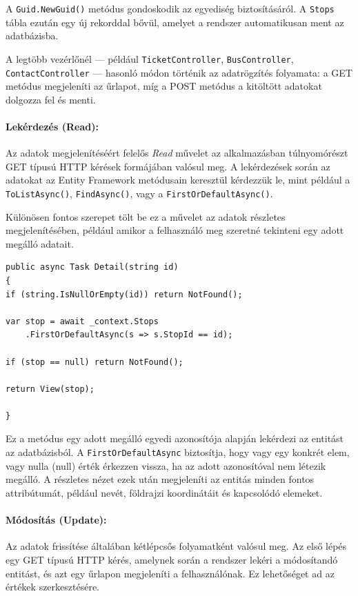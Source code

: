 A \texttt{Guid.NewGuid()} metódus gondoskodik az egyediség biztosításáról. A \texttt{Stops} tábla ezután egy új rekorddal bővül, amelyet a rendszer automatikusan ment az adatbázisba.

A legtöbb vezérlőnél — például \texttt{TicketController}, \texttt{BusController}, \texttt{ContactController} — hasonló módon történik az adatrögzítés folyamata: a GET metódus megjeleníti az űrlapot, míg a POST metódus a kitöltött adatokat dolgozza fel és menti.


\paragraph{Lekérdezés (Read):}
Az adatok megjelenítéséért felelős \textit{Read} művelet az alkalmazásban túlnyomórészt GET típusú HTTP kérések formájában valósul meg. A lekérdezések során az adatokat az Entity Framework metódusain keresztül kérdezzük le, mint például a \texttt{ToListAsync()}, \texttt{FindAsync()}, vagy a \texttt{FirstOrDefaultAsync()}.

Különösen fontos szerepet tölt be ez a művelet az adatok részletes megjelenítésében, például amikor a felhasználó meg szeretné tekinteni egy adott megálló adatait.

\begin{lstlisting}
public async Task Detail(string id)
{
if (string.IsNullOrEmpty(id)) return NotFound();

var stop = await _context.Stops
    .FirstOrDefaultAsync(s => s.StopId == id);

if (stop == null) return NotFound();

return View(stop);

}
\end{lstlisting}

Ez a metódus egy adott megálló egyedi azonosítója alapján lekérdezi az entitást az adatbázisból. A \texttt{FirstOrDefaultAsync} biztosítja, hogy vagy egy konkrét elem, vagy nulla (null) érték érkezzen vissza, ha az adott azonosítóval nem létezik megálló. A részletes nézet ezek után megjeleníti az entitás minden fontos attribútumát, például nevét, földrajzi koordinátáit és kapcsolódó elemeket.


\paragraph{Módosítás (Update):}
Az adatok frissítése általában kétlépcsős folyamatként valósul meg. Az első lépés egy GET típusú HTTP kérés, amelynek során a rendszer lekéri a módosítandó entitást, és azt egy űrlapon megjeleníti a felhasználónak. Ez lehetőséget ad az értékek szerkesztésére.

